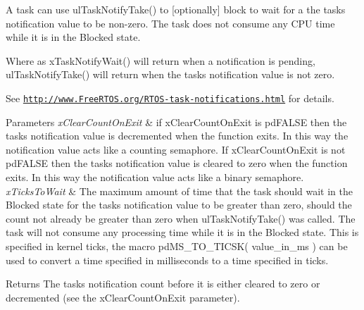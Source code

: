 A task can use ul\+Task\+Notify\+Take() to \mbox{[}optionally\mbox{]} block to wait for a the task\textquotesingle{}s notification value to be non-\/zero. The task does not consume any C\+PU time while it is in the Blocked state.

Where as x\+Task\+Notify\+Wait() will return when a notification is pending, ul\+Task\+Notify\+Take() will return when the task\textquotesingle{}s notification value is not zero.

See \href{http://www.FreeRTOS.org/RTOS-task-notifications.html}{\tt http\+://www.\+Free\+R\+T\+O\+S.\+org/\+R\+T\+O\+S-\/task-\/notifications.\+html} for details.


\begin{DoxyParams}{Parameters}
{\em x\+Clear\+Count\+On\+Exit} & if x\+Clear\+Count\+On\+Exit is pd\+F\+A\+L\+SE then the task\textquotesingle{}s notification value is decremented when the function exits. In this way the notification value acts like a counting semaphore. If x\+Clear\+Count\+On\+Exit is not pd\+F\+A\+L\+SE then the task\textquotesingle{}s notification value is cleared to zero when the function exits. In this way the notification value acts like a binary semaphore.\\
\hline
{\em x\+Ticks\+To\+Wait} & The maximum amount of time that the task should wait in the Blocked state for the task\textquotesingle{}s notification value to be greater than zero, should the count not already be greater than zero when ul\+Task\+Notify\+Take() was called. The task will not consume any processing time while it is in the Blocked state. This is specified in kernel ticks, the macro pd\+M\+S\+\_\+\+T\+O\+\_\+\+T\+I\+C\+S\+K( value\+\_\+in\+\_\+ms ) can be used to convert a time specified in milliseconds to a time specified in ticks.\\
\hline
\end{DoxyParams}
\begin{DoxyReturn}{Returns}
The task\textquotesingle{}s notification count before it is either cleared to zero or decremented (see the x\+Clear\+Count\+On\+Exit parameter). 
\end{DoxyReturn}
